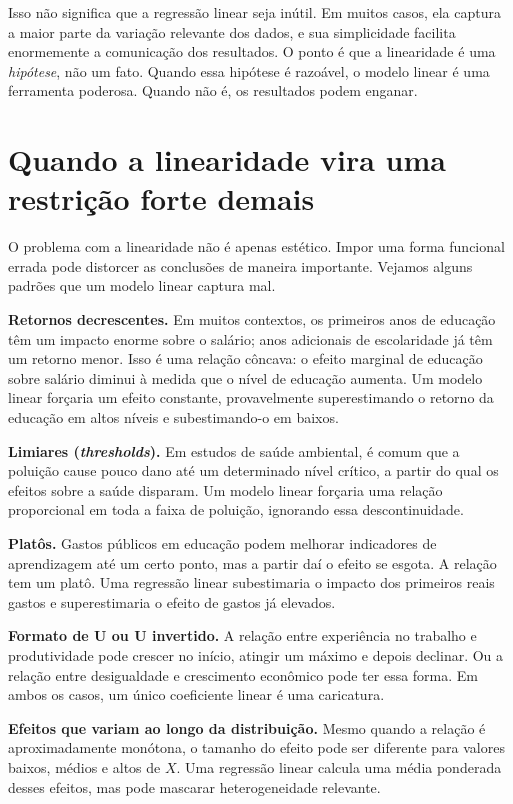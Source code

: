 Isso não significa que a regressão linear seja inútil. Em muitos casos, ela captura
a maior parte da variação relevante dos dados, e sua simplicidade facilita enormemente
a comunicação dos resultados. O ponto é que a linearidade é uma \emph{hipótese}, não
um fato. Quando essa hipótese é razoável, o modelo linear é uma ferramenta poderosa.
Quando não é, os resultados podem enganar.

\chapter{Quando a linearidade vira uma restrição forte demais}

O problema com a linearidade não é apenas estético. Impor uma forma funcional errada
pode distorcer as conclusões de maneira importante. Vejamos alguns padrões que um
modelo linear captura mal.

\textbf{Retornos decrescentes.} Em muitos contextos, os primeiros anos de educação
têm um impacto enorme sobre o salário; anos adicionais de escolaridade já têm um
retorno menor. Isso é uma relação côncava: o efeito marginal de educação sobre salário
diminui à medida que o nível de educação aumenta. Um modelo linear forçaria um efeito
constante, provavelmente superestimando o retorno da educação em altos níveis e
subestimando-o em baixos.

\textbf{Limiares (\emph{thresholds}).} Em estudos de saúde ambiental, é comum que
a poluição cause pouco dano até um determinado nível crítico, a partir do qual os
efeitos sobre a saúde disparam. Um modelo linear forçaria uma relação proporcional em
toda a faixa de poluição, ignorando essa descontinuidade.

\textbf{Platôs.} Gastos públicos em educação podem melhorar indicadores de
aprendizagem até um certo ponto, mas a partir daí o efeito se esgota. A relação tem
um platô. Uma regressão linear subestimaria o impacto dos primeiros reais gastos e
superestimaria o efeito de gastos já elevados.

\textbf{Formato de U ou U invertido.} A relação entre experiência no trabalho e
produtividade pode crescer no início, atingir um máximo e depois declinar. Ou a
relação entre desigualdade e crescimento econômico pode ter essa forma. Em ambos os
casos, um único coeficiente linear é uma caricatura.

\textbf{Efeitos que variam ao longo da distribuição.} Mesmo quando a relação é
aproximadamente monótona, o tamanho do efeito pode ser diferente para valores
baixos, médios e altos de $X$. Uma regressão linear calcula uma média ponderada desses
efeitos, mas pode mascarar heterogeneidade relevante.

